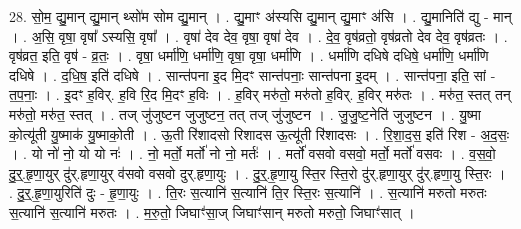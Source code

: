 \documentclass[17pt]{extarticle}
\begin{document}
28. सो॒म॒ द्यु॒मान् द्यु॒मान् थ्सो॑म सोम द्यु॒मान् । . द्यु॒माꣳ अ॑स्यसि द्यु॒मान् द्यु॒माꣳ अ॑सि । . द्यु॒मानिति॑ द्यु - मान् । . अ॒सि॒ वृषा॒ वृषा᳚ ऽस्यसि॒ वृषा᳚ । . वृषा॑ देव देव॒ वृषा॒ वृषा॑ देव । . दे॒व॒ वृष॑व्रतो॒ वृष॑व्रतो देव देव॒ वृष॑व्रतः । . वृष॑व्रत॒ इति॒ वृष॑ - व्र॒तः॒ । . वृषा॒ धर्मा॑णि॒ धर्मा॑णि॒ वृषा॒ वृषा॒ धर्मा॑णि । . धर्मा॑णि दधिषे दधिषे॒ धर्मा॑णि॒ धर्मा॑णि दधिषे । . द॒धि॒ष॒ इति॑ दधिषे । . सान्त॑पना इ॒द मि॒दꣳ सान्त॑पनाः॒ सान्त॑पना इ॒दम् । . सान्त॑पना॒ इति॒ सां - त॒प॒नाः॒ । . इ॒दꣳ ह॒विर्. ह॒वि रि॒द मि॒दꣳ ह॒विः । . ह॒विर् मरु॑तो॒ मरु॑तो ह॒विर्. ह॒विर् मरु॑तः । . मरु॑त॒ स्तत् तन् मरु॑तो॒ मरु॑त॒ स्तत् । . तज् जु॑जुष्टन जुजुष्टन॒ तत् तज् जु॑जुष्टन । . जु॒जु॒ष्ट॒नेति॑ जुजुष्टन । . यु॒ष्मा को॒त्यू॑ती यु॒ष्माक॑ यु॒ष्माको॒ती । . ऊ॒ती रि॑शादसो रिशादस ऊ॒त्यू॑ती रि॑शादसः । . रि॒शा॒द॒स॒ इति॑ रिश - अ॒द॒सः॒ । . यो नो॑ नो॒ यो यो नः॑ । . नो॒ मर्तो॒ मर्तो॑ नो नो॒ मर्तः॑ । . मर्तो॑ वसवो वसवो॒ मर्तो॒ मर्तो॑ वसवः । . व॒स॒वो॒ दु॒र्॒.हृ॒णा॒युर् दु॑र्.हृणा॒युर् व॑सवो वसवो दुर्.हृणा॒युः । . दु॒र्॒.हृ॒णा॒यु स्ति॒र स्ति॒रो दु॑र्.हृणा॒युर् दु॑र्.हृणा॒यु स्ति॒रः । . दु॒र्॒.हृ॒णा॒युरिति॑ दुः - हृ॒णा॒युः । . ति॒रः स॒त्यानि॑ स॒त्यानि॑ ति॒र स्ति॒रः स॒त्यानि॑ । . स॒त्यानि॑ मरुतो मरुतः स॒त्यानि॑ स॒त्यानि॑ मरुतः । . म॒रु॒तो॒ जिघाꣳ॑सा॒ज् जिघाꣳ॑सान् मरुतो मरुतो॒ जिघाꣳ॑सात् । \newline
\end{document}
